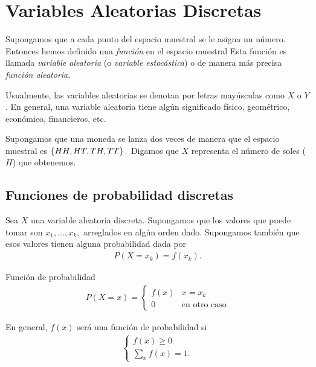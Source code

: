 \chapter{Variables Aleatorias Discretas}


Supongamos que a cada punto del espacio muestral se le asigna un número.  Entonces hemos definido una \emph{función} en el espacio muestral  Esta función es llamada \emph{variable aleatoria} (o \emph{variable estocástica}) o de manera más precisa \emph{función aleatoria}. 


Usualmente, las variables aleatorias se denotan por letras mayúsculas como $X$ o $Y$. En general, una variable aleatoria tiene algún significado físico, geométrico, económico, financieros, etc.



\begin{ejemplo}
  \label{exmp:2.1}
Supongamos que una moneda se lanza dos veces de manera que el espacio muestral es $\left\{ HH,HT,TH,TT \right\}.$  Digamos que $X$ representa el número de soles ($H$) que obtenemos.
\end{ejemplo}


\section{Funciones de probabilidad discretas}

 Sea $X$ una variable aleatoria discreta.  Supongamos que los valores que puede tomar son $x_{1},...,x_{k},$ arreglados en algún orden dado.  Supongamos también que esos valores
 tienen alguna probabilidad dada por
 \begin{align}
 \label{2.1}
 	P(X=x_{k})=f(x_{k}).
 \end{align}


{Función de probabilidad}
\begin{align}
\label{2.2}
P(X=x)=
\begin{cases}
f(x) & x=x_{k} \\
0	& \text{en otro caso}
\end{cases}
\end{align}



	En general, $f(x)$ será una función de probabilidad si
	\begin{align*}
		\begin{cases}
			f(x)\geq 0 \\
			\sum_{x}f(x)=1.
		\end{cases}
	\end{align*}



